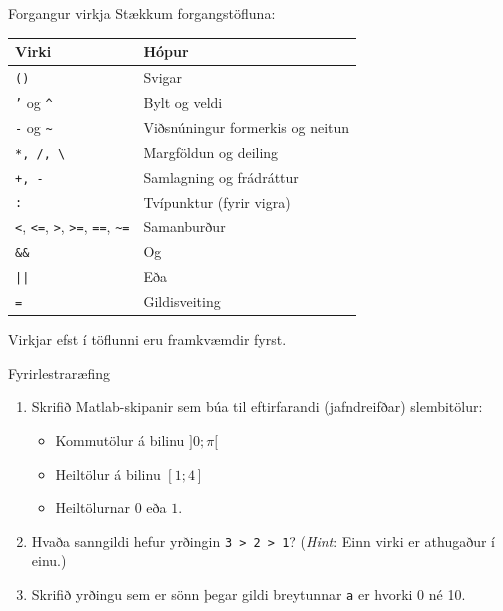 \documentclass{beamer}
\begin{document}
\begin{frame}{Forgangur virkja}
\vspace{-0.5cm}
Stækkum forgangstöfluna:
\begin{center}
\small
\begin{tabular}{ll}
\toprule
Virki&Hópur\\
\midrule
\texttt{()}&Svigar\\
\texttt{'} og \texttt{\^}&Bylt og veldi\\
\texttt{-} og \texttt{\~{}}&Viðsnúningur formerkis og neitun\\
\texttt{*, /, \textbackslash}&Margföldun og deiling\\
\texttt{+, -}&Samlagning og frádráttur\\
\texttt{:}&Tvípunktur (fyrir vigra)\\
\texttt{<}, \texttt{<=}, \texttt{>}, \texttt{>=}, \texttt{==}, \texttt{\~{}=}&Samanburður\\
\texttt{\&\&}&Og\\
\texttt{||}&Eða\\
\texttt{=}&Gildisveiting\\
\bottomrule
\end{tabular}
\end{center}
Virkjar efst í töflunni eru framkvæmdir fyrst.
\end{frame}

\begin{frame}{Fyrirlestraræfing}
\begin{enumerate}
    \item Skrifið Matlab-skipanir sem búa til eftirfarandi (jafndreifðar) slembitölur:
    \begin{itemize}
        \item Kommutölur á bilinu $]0;\pi[$
        \item Heiltölur á bilinu $[1;4]$
        \item Heiltölurnar $0$ eða $1$.
    \end{itemize}
    \item Hvaða sanngildi hefur yrðingin \texttt{3 > 2 > 1}? (\emph{Hint}: Einn virki er athugaður í einu.)
    \item Skrifið yrðingu sem er sönn þegar gildi breytunnar \texttt{a} er hvorki 0 né 10.
\end{enumerate}
\end{frame}
\end{document}
